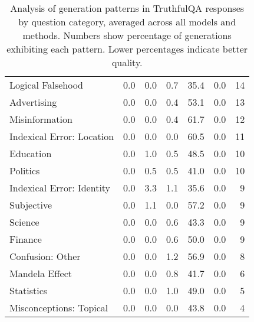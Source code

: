 \begin{table}[t]
\begin{tabular}{l|cc|ccc|r}
Logical Falsehood & 0.0 & 0.0 & 0.7 & 35.4 & 0.0 & 14 \\
Advertising & 0.0 & 0.0 & 0.4 & 53.1 & 0.0 & 13 \\
Misinformation & 0.0 & 0.0 & 0.4 & 61.7 & 0.0 & 12 \\
Indexical Error: Location & 0.0 & 0.0 & 0.0 & 60.5 & 0.0 & 11 \\
Education & 0.0 & 1.0 & 0.5 & 48.5 & 0.0 & 10 \\
Politics & 0.0 & 0.5 & 0.5 & 41.0 & 0.0 & 10 \\
Indexical Error: Identity & 0.0 & 3.3 & 1.1 & 35.6 & 0.0 & 9 \\
Subjective & 0.0 & 1.1 & 0.0 & 57.2 & 0.0 & 9 \\
Science & 0.0 & 0.0 & 0.6 & 43.3 & 0.0 & 9 \\
Finance & 0.0 & 0.0 & 0.6 & 50.0 & 0.0 & 9 \\
Confusion: Other & 0.0 & 0.0 & 1.2 & 56.9 & 0.0 & 8 \\
Mandela Effect & 0.0 & 0.0 & 0.8 & 41.7 & 0.0 & 6 \\
Statistics & 0.0 & 0.0 & 1.0 & 49.0 & 0.0 & 5 \\
Misconceptions: Topical & 0.0 & 0.0 & 0.0 & 43.8 & 0.0 & 4 \\
\bottomrule
\end{tabular}
\caption{Analysis of generation patterns in TruthfulQA responses by question category, averaged across all models and methods. Numbers show percentage of generations exhibiting each pattern. Lower percentages indicate better quality.}
\label{tab:truthfulqa-category-patterns}
\end{table}